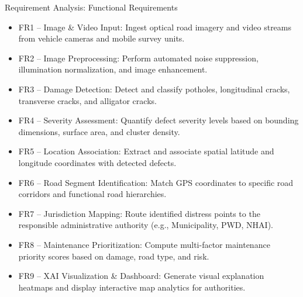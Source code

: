 \documentclass[10pt]{beamer}
\def\textbf#1{#1}%
\def\begin#1{}%
\def\end#1{}%
\begin{document}
\begin{frame}{Requirement Analysis: Functional Requirements}
    \begin{itemize}
        \setlength{\itemsep}{0.4em}
        \item \textbf{FR1 -- Image \& Video Input:} Ingest optical road imagery and video streams from vehicle cameras and mobile survey units.
        \item \textbf{FR2 -- Image Preprocessing:} Perform automated noise suppression, illumination normalization, and image enhancement.
        \item \textbf{FR3 -- Damage Detection:} Detect and classify potholes, longitudinal cracks, transverse cracks, and alligator cracks.
        \item \textbf{FR4 -- Severity Assessment:} Quantify defect severity levels based on bounding dimensions, surface area, and cluster density.
        \item \textbf{FR5 -- Location Association:} Extract and associate spatial latitude and longitude coordinates with detected defects.
        \item \textbf{FR6 -- Road Segment Identification:} Match GPS coordinates to specific road corridors and functional road hierarchies.
        \item \textbf{FR7 -- Jurisdiction Mapping:} Route identified distress points to the responsible administrative authority (e.g., Municipality, PWD, NHAI).
        \item \textbf{FR8 -- Maintenance Prioritization:} Compute multi-factor maintenance priority scores based on damage, road type, and risk.
        \item \textbf{FR9 -- XAI Visualization \& Dashboard:} Generate visual explanation heatmaps and display interactive map analytics for authorities.
    \end{itemize}
\end{frame}
\end{document}
